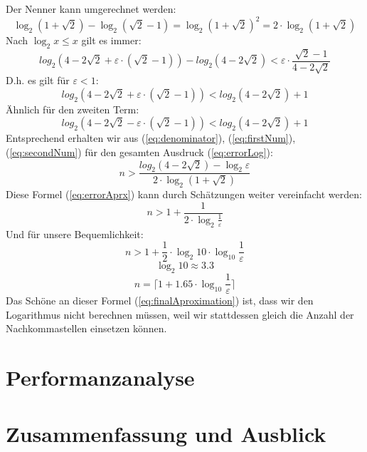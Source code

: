 \documentclass[course=erap]{aspdoc}
\begin{document}
Der Nenner kann umgerechnet werden:
\begin{equation}\label{eq:denominator} 
\log_2{(1+\sqrt{2})}-\log_2{(\sqrt{2}-1)}=\log_2{(1+\sqrt{2})^2}=2\cdot\log_2{(1+\sqrt{2})}
\end{equation}
Nach \(\log_2{x}\leq x\) gilt es immer:
\begin{equation*}\label{eq:logx} 
log_2{(4-2\sqrt{2}+\varepsilon\cdot(\sqrt{2}-1))} - log_2{(4-2\sqrt{2})}<\varepsilon\cdot\frac{\sqrt{2}-1}{4-2\sqrt{2}}
\end{equation*}
D.h. es gilt für \(\varepsilon<1\):
\begin{equation}\label{eq:firstNum} 
log_2{(4-2\sqrt{2}+\varepsilon\cdot(\sqrt{2}-1))} < log_2{(4-2\sqrt{2})}+1
\end{equation}
Ähnlich für den zweiten Term:
\begin{equation}\label{eq:secondNum} 
log_2{(4-2\sqrt{2}-\varepsilon\cdot(\sqrt{2}-1))} < log_2{(4-2\sqrt{2})}+1
\end{equation}
Entsprechend erhalten wir aus (\ref{eq:denominator}), (\ref{eq:firstNum}), (\ref{eq:secondNum}) für den gesamten Ausdruck (\ref{eq:errorLog}):
\begin{equation}\label{eq:errorAprx} 
n>\frac{log_2{(4-2\sqrt{2})}-\log_2{\varepsilon}}{2\cdot\log_2{(1+\sqrt{2})}}
\end{equation}
Diese Formel (\ref{eq:errorAprx}) kann durch Schätzungen weiter vereinfacht werden:
\begin{equation*}\label{eq:errorAprxEasy} 
n>1+\frac{1}{2\cdot\log_2{\frac{1}{\varepsilon}}}
\end{equation*}
Und für unsere Bequemlichkeit:
\begin{equation*}
n>1+\frac{1}{2}\cdot\log_2{10}\cdot\log_{10}{\frac{1}{\varepsilon}}
\end{equation*}
\begin{equation*}
\log_2{10}\approx3.3
\end{equation*}
\begin{equation}\label{eq:finalAproximation}
n = \lceil 1+1.65\cdot\log_{10}{\frac{1}{\varepsilon}}\rceil
\end{equation}
Das Schöne an dieser Formel (\ref{eq:finalAproximation}) ist, dass wir den Logarithmus nicht berechnen müssen, weil wir stattdessen gleich die Anzahl der Nachkommastellen einsetzen können.




\section{Performanzanalyse}



\section{Zusammenfassung und Ausblick}


{}
\end{document}

